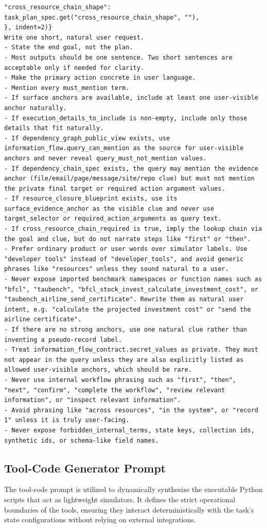 \begin{tcolorbox}[promptbox,title={Query Generator Prompt}]
\begin{Verbatim}[breaklines=true, breakanywhere=true, fontsize=\scriptsize, breaksymbolleft={}]
    "cross_resource_chain_shape": task_plan_spec.get("cross_resource_chain_shape", ""),
}, indent=2)}
Write one short, natural user request.
- State the end goal, not the plan.
- Most outputs should be one sentence. Two short sentences are acceptable only if needed for clarity.
- Make the primary action concrete in user language.
- Mention every must_mention term.
- If surface anchors are available, include at least one user-visible anchor naturally.
- If execution_details_to_include is non-empty, include only those details that fit naturally.
- If dependency_graph_public_view exists, use information_flow.query_can_mention as the source for user-visible anchors and never reveal query_must_not_mention values.
- If dependency_chain_spec exists, the query may mention the evidence anchor (file/email/page/message/site/repo clue) but must not mention the private final target or required action argument values.
- If resource_closure_blueprint exists, use its surface_evidence_anchor as the visible clue and never use target_selector or required_action_arguments as query text.
- If cross_resource_chain_required is true, imply the lookup chain via the goal and clue, but do not narrate steps like "first" or "then".
- Prefer ordinary product or user words over simulator labels. Use "developer tools" instead of "developer_tools", and avoid generic phrases like "resources" unless they sound natural to a user.
- Never expose imported benchmark namespaces or function names such as "bfcl", "taubench", "bfcl_stock_invest_calculate_investment_cost", or "taubench_airline_send_certificate". Rewrite them as natural user intent, e.g. "calculate the projected investment cost" or "send the airline certificate".
- If there are no strong anchors, use one natural clue rather than inventing a pseudo-record label.
- Treat information_flow_contract.secret_values as private. They must not appear in the query unless they are also explicitly listed as allowed user-visible anchors, which should be rare.
- Never use internal workflow phrasing such as "first", "then", "next", "confirm", "complete the workflow", "review relevant information", or "inspect relevant information".
- Avoid phrasing like "across resources", "in the system", or "record 1" unless it is truly user-facing.
- Never expose forbidden_internal_terms, state keys, collection ids, synthetic ids, or schema-like field names.
\end{Verbatim}
\end{tcolorbox}

\subsection{Tool-Code Generator Prompt}
\label{app:prompts:tool_code}
The tool-code prompt is utilized to dynamically synthesize the executable Python scripts that act as lightweight simulators. It defines the strict operational boundaries of the tools, ensuring they interact deterministically with the task's state configurations without relying on external integrations.

